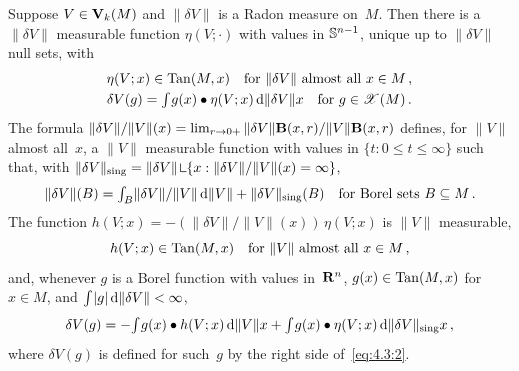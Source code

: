 \begin{theorem}
    \label{al:4.3}
    Suppose $V \in \mathbf{V}_{k}(M)$ and $\|\delta V\|$ is a Radon measure on~$M$. Then there is
    a $\|\delta V\|$ measurable function $\eta(V;\cdot)$ with values in $\mathbb{S}^{n-1}$,
    unique up to $\|\delta V\|$ null sets, with
    \begin{gather}
        \label{eq:4.3:1}
        \eta(V;x) \in \operatorname{Tan}(M,x) \quad \text{for $\|\delta V\|$ almost all $x \in M$} \,, \\
        \label{eq:4.3:2}
        \delta V(g) = {\textstyle\int_{}^{}} g(x) \bullet \eta(V;x) \,\mathrm{d} \|\delta V\| x \quad \text{for $g
        \in \mathscr{X}(M)$} \,.
    \end{gather}
    The formula $\|\delta V\| / \|V\|(x) = \lim_{r \to 0+} \|\delta V\| \mathbf{B}(x,r) / \|V\|
    \mathbf{B}(x,r)$ defines, for $\|V\|$ almost all~$x$, a $\|V\|$ measurable function with values
    in $\{ t : 0 \le t \le \infty \}$ such that, with $\|\delta V\|_{\mathrm{sing}} = \|\delta V\|
    \restrict \{ x : \|\delta V\| / \|V\|(x) = \infty \}$,
    \begin{equation}
        \label{eq:4.3:3}
        \|\delta V\|(B) = {\textstyle\int_{B}^{}} \|\delta V\| / \|V\| \,\mathrm{d} \|V\| + \|\delta
        V\|_{\mathrm{sing}}(B) \quad \text{for Borel sets $B \subseteq M$} \,.
    \end{equation}
    The function $h(V;x) = - (\|\delta V\| / \|V\|(x)) \, \eta(V;x)$ is $\|V\|$ measurable,
    \begin{equation}
        \label{eq:4.3:4}
        h(V;x) \in \operatorname{Tan}(M,x) \quad \text{for $\|V\|$ almost all $x \in M$} \,,
    \end{equation}
    and, whenever $g$ is a Borel function with values in~$\mathbf{R}^{n}$, $g(x) \in \operatorname{Tan}(M,x)$ for
    $x \in M$, and ${\textstyle\int_{}^{}} |g| \,\mathrm{d} \|\delta V\| < \infty$,
    \begin{equation}
        \label{eq:4.3:5}
        \delta V(g) = - {\textstyle\int_{}^{}} g(x) \bullet h(V;x) \,\mathrm{d} \|V\| x + {\textstyle\int_{}^{}} g(x) \bullet
        \eta(V;x) \,\mathrm{d} \|\delta V\|_{\mathrm{sing}} x \,,
    \end{equation}
    where $\delta V(g)$ is defined for such~$g$ by the right side of~\eqref{eq:4.3:2}.
\end{theorem}

